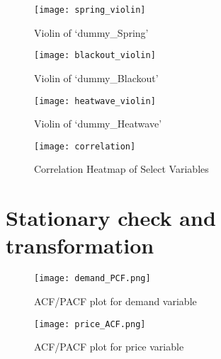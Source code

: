 \documentclass[11pt]{article}
\begin{document}
\begin{figure}[H]
\centering
\begin{minipage}{.5\textwidth}
  \centering
  \texttt{[image: spring\_violin]}
   \caption{Violin of `dummy\_Spring'}
   \label{fig:spring_violin}
\end{minipage}%
\end{figure}

\begin{figure}[H]
\centering
\begin{minipage}{.5\textwidth}
  \centering
  \texttt{[image: blackout\_violin]}
   \caption{Violin of `dummy\_Blackout'}
   \label{fig:blackout_violin}
\end{minipage}%
\begin{minipage}{.5\textwidth}
  \centering
  \texttt{[image: heatwave\_violin]}
   \caption{Violin of `dummy\_Heatwave'}
   \label{fig:heatwave_violin}
\end{minipage}%
\end{figure}

\begin{figure}[H]
\centering
\begin{minipage}{.8\textwidth}
  \centering
  \texttt{[image: correlation]}
   \caption{Correlation Heatmap of Select Variables}
   \label{fig:correlation}
\end{minipage}%
\end{figure}


\section{Stationary check and transformation}


\begin{figure}[H]
\centering
\begin{minipage}{.9\textwidth}
  \centering
  \texttt{[image: demand\_PCF.png]}
   \caption{ACF/PACF plot for demand variable}
   \label{fig:demand_PCF}
\end{minipage}%
\end{figure}

\begin{figure}[H]
\centering
\begin{minipage}{.9\textwidth}
  \centering
  \texttt{[image: price\_ACF.png]}
   \caption{ACF/PACF plot for price variable}
   \label{fig:price_PCF}
\end{minipage}%
\end{figure}
\end{document}
